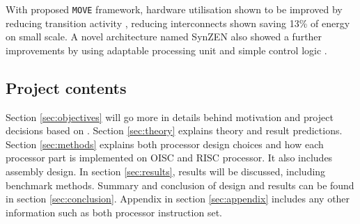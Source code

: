 With proposed \texttt{MOVE} framework, hardware utilisation shown to be improved by reducing transition activity \autocite{1207041}, reducing interconnects shown saving 13\% of energy \autocite{6972455} on small scale. A novel architecture named SynZEN also showed a further improvements by using adaptable processing unit and simple control logic \autocite{6403142}.

\subsection{Project contents}
Section \ref{sec:objectives} will go more in details behind motivation and project decisions based on . Section \ref{sec:theory} explains theory and result predictions. Section \ref{sec:methods} explains both processor design choices and how each processor part is implemented on OISC and RISC processor. It also includes assembly design. In section \ref{sec:results}, results will be discussed, including benchmark methods. Summary and conclusion of design and results can be found in section \ref{sec:conclusion}. Appendix in section \ref{sec:appendix} includes any other information such as both processor instruction set.

